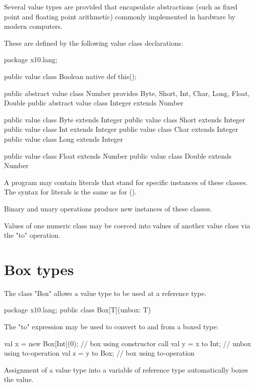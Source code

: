 Several value types are provided that encapsulate
abstractions (such as fixed point and floating point arithmetic)
commonly implemented in hardware by modern computers.

These are defined by the following value class declarations:
\begin{xten}
package x10.lang;

public value class Boolean { native def this(); }

public abstract value class Number
    provides Byte, Short, Int, Char, Long, Float, Double { }
public abstract value class Integer extends Number { }

public value class Byte extends Integer  { }
public value class Short extends Integer { }
public value class Int extends Integer   { }
public value class Char extends Integer  { }
public value class Long extends Integer  { }

public value class Float extends Number  { }
public value class Double extends Number { }
\end{xten}

A program may contain literals
that stand for specific instances of these classes. The syntax
for literals is the same as for \java{} ().

Binary and unary operations produce new instances of these
classes.

Values of one numeric class may be coerced into values of
another value class via the \xcd"to" operation.





\section{Box types}
\label{BoxType}

The class \xcd"Box" allows a value type to be used at a
reference type.

\begin{xten}
package x10.lang;
public class Box[T](unbox: T) { }
\end{xten}

The \xcd"to" expression may be used to convert to and from a
boxed type:

\begin{xten}
val x = new Box[Int](0); // box using constructor call
val y = x to Int;        // unbox using to-operation
val z = y to Box;        // box using to-operation
\end{xten}

Assignment of a value type into a variable of reference type
automatically boxes the value.

